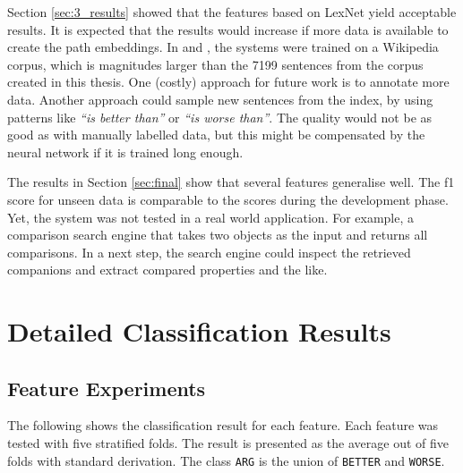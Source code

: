 Section \ref{sec:3_results} showed that the features based on LexNet yield acceptable results. It is expected that the results would increase if more data is available to create the path embeddings. In \cite{DBLP:conf/acl/ShwartzGD16} and \cite{DBLP:journals/corr/ShwartzD16}, the systems were trained on a Wikipedia corpus, which is magnitudes larger than the 7199 sentences from the corpus created in this thesis. One (costly) approach for future work is to annotate more data. Another approach could sample new sentences from the index, by using patterns like \emph{\enquote{is better than}} or \emph{\enquote{is worse than}}. The quality would not be as good as with manually labelled data, but this might be compensated by the neural network if it is trained long enough.

The results in Section \ref{sec:final} show that several features generalise well. The f1 score for unseen data is comparable to the scores during the development phase. Yet, the system was not tested in a real world application. For example, a comparison search engine that takes two objects as the input and returns all comparisons. In a next step, the search engine could inspect the retrieved companions and extract compared properties and the like.

\appendix

	\chapter{Detailed Classification Results}
\section{Feature Experiments}
	\setcounter{section}{1}
	The following shows the classification result for each feature. Each feature was tested with five stratified folds. The result is presented as the average out of five folds with standard derivation. The class \texttt{ARG} is the union of \texttt{BETTER} and \texttt{WORSE}.
	

